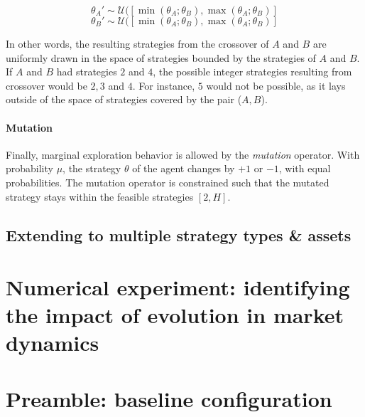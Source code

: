 \documentclass{article}
\begin{document}
\begin{equation}
    \theta_A' \sim \mathcal{U}([\min(\theta_A; \theta_B), \max(\theta_A; \theta_B)] 
\end{equation}
\begin{equation}
    \theta_B' \sim \mathcal{U}([\min(\theta_A; \theta_B), \max(\theta_A; \theta_B)] 
\end{equation}

In other words, the resulting strategies from the crossover of $A$ and $B$ are uniformly drawn in the space of strategies bounded by the strategies of $A$ and $B$. If $A$ and $B$ had strategies $2$ and $4$, the possible integer strategies resulting from crossover would be $2, 3$ and $4$. For instance, $5$ would not be possible, as it lays outside of the space of strategies covered by the pair ($A,B$).\\

\paragraph{Mutation} Finally, marginal exploration behavior is allowed by the \textit{mutation} operator. With probability $\mu$, the strategy $\theta$ of the agent changes by $+1$ or $-1$, with equal probabilities. The mutation operator is constrained such that the mutated strategy stays within the feasible strategies $[2, H]$. 



\subsection{Extending to multiple strategy types \& assets}

\section{Numerical experiment: identifying the impact of evolution in market dynamics}



\section{Preamble: baseline configuration}
\end{document}
